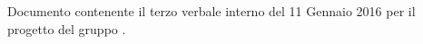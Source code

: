 Documento contenente il terzo verbale interno del 11 Gennaio 2016 per il progetto \progetto del gruppo \gruppo.